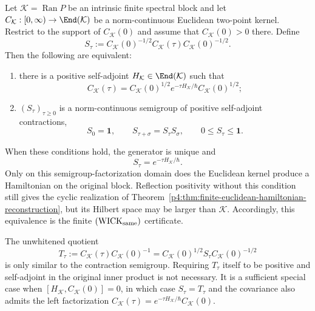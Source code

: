 \documentclass[12pt,a4paper]{article}
\begin{document}
\begin{lemma}
\label{p4:lem:positive-frequency-generator-from-euclidean-block}
Let \(\mathcal K=\operatorname{Ran}P\) be an intrinsic finite spectral block
and let
\(C_{\mathcal K}:[0,\infty)\to\End(\mathcal K)\) be a norm-continuous
Euclidean two-point kernel.  Restrict to the support of
\(C_{\mathcal K}(0)\) and assume that \(C_{\mathcal K}(0)>0\) there.  Define
\[
 S_\tau:=
 C_{\mathcal K}(0)^{-1/2}
 C_{\mathcal K}(\tau)
 C_{\mathcal K}(0)^{-1/2}.
\]
Then the following are equivalent:
\begin{enumerate}[label=(\roman*),leftmargin=2.2em]
\item there is a positive self-adjoint
\(H_{\mathcal K}\in\End(\mathcal K)\) such that
\[
 C_{\mathcal K}(\tau)
 =C_{\mathcal K}(0)^{1/2}
 e^{-\tau H_{\mathcal K}/\hbar}
 C_{\mathcal K}(0)^{1/2};
\]
\item \((S_\tau)_{\tau\ge0}\) is a norm-continuous semigroup of positive
self-adjoint contractions,
\begin{equation}
\label{p4:eq:one-particle-euclidean-spectral-block}
 S_0=\mathbf1,\qquad
 S_{\tau+\sigma}=S_\tau S_\sigma,\qquad
 0\le S_\tau\le\mathbf1.
\end{equation}
\end{enumerate}
When these conditions hold, the generator is unique and
\[
 \boxed{S_\tau=e^{-\tau H_{\mathcal K}/\hbar}.}
\]
Only on this semigroup-factorization domain does the Euclidean kernel
produce a Hamiltonian on the original block.  Reflection positivity without
this condition still gives the cyclic realization of
Theorem~\ref{p4:thm:finite-euclidean-hamiltonian-reconstruction}, but its
Hilbert space may be larger than \(\mathcal K\).
Accordingly, this equivalence is the finite
\((\mathrm{WICK}_{\rm same})\) certificate.

The unwhitened quotient
\[
 T_\tau:=C_{\mathcal K}(\tau)C_{\mathcal K}(0)^{-1}
 =C_{\mathcal K}(0)^{1/2}S_\tau
  C_{\mathcal K}(0)^{-1/2}
\]
is only similar to the contraction semigroup.  Requiring \(T_\tau\) itself
to be positive and self-adjoint in the original inner product is not
necessary.  It is a sufficient special case when
\([H_{\mathcal K},C_{\mathcal K}(0)]=0\), in which case
\(S_\tau=T_\tau\) and the covariance also admits the left factorization
\(C_{\mathcal K}(\tau)=e^{-\tau H_{\mathcal K}/\hbar}
C_{\mathcal K}(0)\).
\end{lemma}
\end{document}

